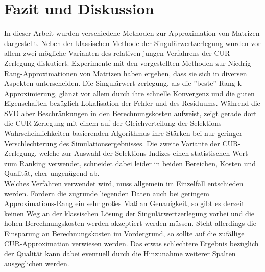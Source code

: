 \documentclass[12pt,a4paper,twoside]{article}
\begin{document}
\section{Fazit und Diskussion}
In dieser Arbeit wurden verschiedene Methoden zur Approximation von Matrizen dargestellt. Neben der klassischen Methode der Singulärwertzerlegung wurden vor allem zwei mögliche Varianten des relativen jungen Verfahrens der CUR-Zerlegung diskutiert. \newline
	Experimente mit den vorgestellten Methoden zur Niedrig-Rang-Approximationen von Matrizen haben ergeben, dass sie sich in diversen Aspekten unterscheiden. Die Singulärwert-zerlegung, als die ''beste'' Rang-k-Approximierung, glänzt vor allem durch ihre schnelle Konvergenz und die guten Eigenschaften bezüglich Lokalisation der Fehler und des Residuums. Während die SVD aber Beschränkungen in den Berechnungskosten aufweist, zeigt gerade dort die CUR-Zerlegung mit einem auf der Gleichverteilung der Selektions-Wahrscheinlichkeiten basierenden Algorithmus ihre Stärken bei nur geringer Verschlechterung des Simulationsergebnisses. Die zweite Variante der CUR-Zerlegung, welche zur Auswahl der Selektions-Indizes einen statistischen Wert zum Ranking verwendet, schneidet dabei leider in beiden Bereichen, Kosten und Qualität, eher ungenügend ab. \\
	Welches Verfahren verwendet wird, muss allgemein im Einzelfall entschieden werden. Fordern die zugrunde liegenden Daten auch bei geringem Approximations-Rang ein sehr großes Maß an Genauigkeit, so gibt es derzeit keinen Weg an der klassischen Lösung der Singulärwertzerlegung vorbei und die hohen Berechnungskosten werden akzeptiert werden müssen. Steht allerdings die Einsparung an Berechnungskosten im Vordergrund, so sollte auf die zufällige CUR-Approximation verwiesen werden. Das etwas schlechtere Ergebnis bezüglich der Qualität kann dabei eventuell durch die Hinzunahme weiterer Spalten ausgeglichen werden.
	
	\newpage

\end{document}
